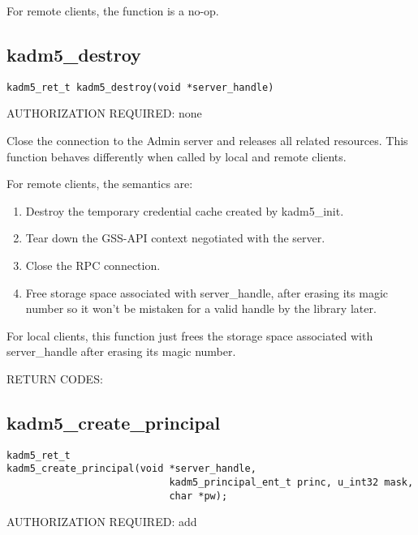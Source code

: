 For remote clients, the function is a no-op.

\subsection{kadm5_destroy}

\begin{verbatim}
kadm5_ret_t kadm5_destroy(void *server_handle)
\end{verbatim}

AUTHORIZATION REQUIRED: none

Close the connection to the Admin server and releases all related
resources.  This function behaves differently when called by local and
remote clients.

For remote clients, the semantics are:

\begin{enumerate}
\item Destroy the temporary credential cache created by
kadm5_init.

\item Tear down the GSS-API context negotiated with the server.

\item Close the RPC connection.

\item Free storage space associated with server_handle, after erasing
its magic number so it won't be mistaken for a valid handle by the
library later.
\end{enumerate}

For local clients, this function just frees the storage space
associated with server_handle after erasing its magic number.

RETURN CODES:

\subsection{kadm5_create_principal}

\begin{verbatim}
kadm5_ret_t
kadm5_create_principal(void *server_handle,
                            kadm5_principal_ent_t princ, u_int32 mask,
                            char *pw);
\end{verbatim}

AUTHORIZATION REQUIRED: add

